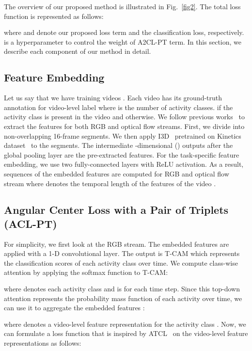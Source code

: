 \documentclass[runningheads]{llncs}
\newcommand{\tcam}{\mbox{T-CAM}}
\newcommand{\ourlossname}{\mbox{A2CL-PT}}
\newcommand{\intlossnamelong}{Angular Center Loss with a Pair of Triplets}
\newcommand{\intlossname}{\mbox{ACL-PT}}
\newcommand{\atclossname}{\mbox{ATCL}}
\begin{document}
The overview of our proposed method is illustrated in Fig.~\ref{fig2}. The total loss function is represented as follows:

where  and  denote our proposed loss term and the classification loss, respectively.  is a hyperparameter to control the weight of \ourlossname{} term.
In this section, we describe each component of our method in detail.

\subsection{Feature Embedding}
Let us say that we have  training videos . Each video  has its ground-truth annotation for video-level label  where  is the number of activity classes.  if the activity class  is present in the video and  otherwise. We follow previous works~\cite{paul2018w,narayan20193c} to extract the features for both RGB and optical flow streams. First, we divide  into non-overlapping 16-frame segments. We then apply I3D~\cite{carreira2017quo} pretrained on Kinetics dataset~\cite{kay2017kinetics} to the segments. The intermediate -dimensional () outputs after the global pooling layer are the pre-extracted features. For the task-specific feature embedding, we use two fully-connected layers with ReLU activation. As a result, sequences of the embedded features  are computed for RGB and optical flow stream where  denotes the temporal length of the features of the video .

\subsection{\intlossnamelong{} (\intlossname{})}
\label{subsec:adot}
For simplicity, we first look at the RGB stream. The embedded features  are applied with a 1-D convolutional layer. The output is \tcam{}  which represents the classification scores of each activity class over time. We compute class-wise attention  by applying the softmax function to \tcam{}:

where  denotes each activity class and  is for each time step. Since this top-down attention represents the probability mass function of each activity over time, we can use it to aggregate the embedded features :

where  denotes a video-level feature representation for the activity class . Now, we can formulate a loss function that is inspired by \atclossname{}~\cite{li2019angular} on the video-level feature representations as follows:
\end{document}
